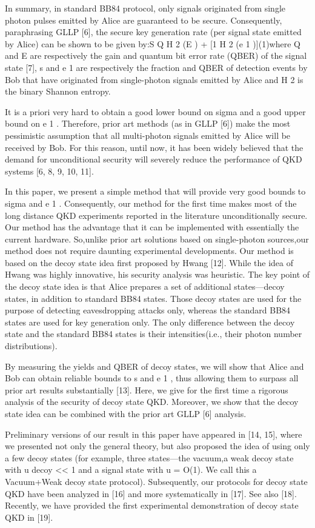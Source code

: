 In summary, in standard BB84 protocol, only signals originated from single photon pulses emitted by Alice are guaranteed to be secure. Consequently, paraphrasing GLLP [6], the secure key generation rate (per signal state emitted by Alice) can be shown to be given by:S  Q  {H 2 (E  ) + [1  H 2 (e 1 )]}(1)where Q  and E  are respectively the gain and quantum bit error rate (QBER) of the signal state [7], s and e 1 are respectively the fraction and QBER of detection events by Bob that have originated from single-photon signals emitted by Alice and H 2 is the binary Shannon entropy.

It is a priori very hard to obtain a good lower bound on sigma and a good upper bound on e 1 . Therefore, prior art methods (as in GLLP [6]) make the most pessimistic assumption that all multi-photon signals emitted by Alice will be received by Bob. For this reason, until now, it has been widely believed that the demand for unconditional security will severely reduce the performance of QKD systems [6, 8, 9, 10, 11].

In this paper, we present a simple method that will provide very good bounds to sigma and e 1 . Consequently, our method for the first time makes most of the long distance QKD experiments reported in the literature unconditionally secure. Our method has the advantage that it can be implemented with essentially the current hardware. So,unlike prior art solutions based on single-photon sources,our method does not require daunting experimental developments. Our method is based on the decoy state idea first proposed by Hwang [12]. While the idea of Hwang was highly innovative, his security analysis was heuristic. The key point of the decoy state idea is that Alice prepares a set of additional states—decoy states, in addition to standard BB84 states. Those decoy states are used for the purpose of detecting eavesdropping attacks only, whereas the standard BB84 states are used for key generation only. The only difference between the decoy state and the standard BB84 states is their intensities(i.e., their photon number distributions).

By measuring the yields and QBER of decoy states, we will show that Alice and Bob can obtain reliable bounds to s and e 1 , thus allowing them to surpass all prior art results substantially [13]. Here, we give for the first time a rigorous analysis of the security of decoy state QKD. Moreover, we show that the decoy state idea can be combined with the prior art GLLP [6] analysis.

Preliminary versions of our result in this paper have appeared in [14, 15], where we presented not only the general theory, but also proposed the idea of using only a few decoy states (for example, three states—the vacuum,a weak decoy state with u decoy << 1 and a signal state with u = O(1). We call this a Vacuum+Weak decoy state protocol). Subsequently, our protocols for decoy state QKD have been analyzed in [16] and more systematically in [17]. See also [18]. Recently, we have provided the first experimental demonstration of decoy state QKD in [19].

